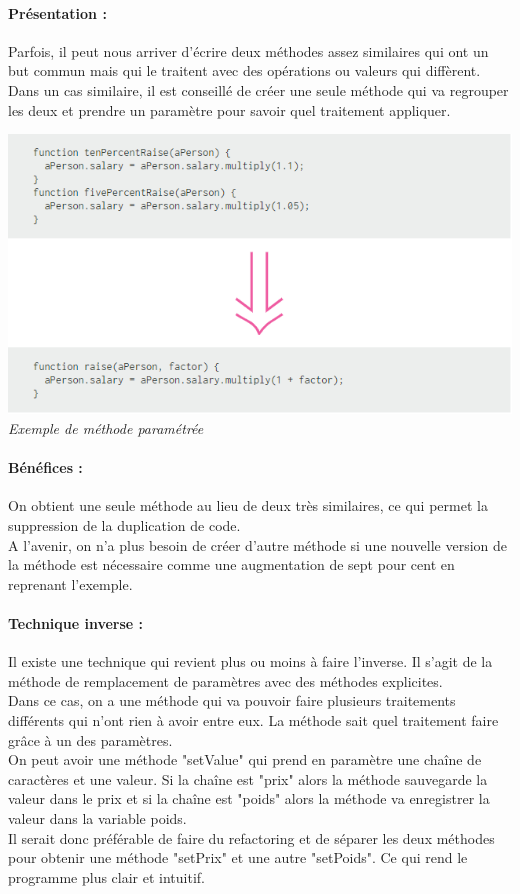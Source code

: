 \documentclass[a4paper,twoside,12pt,openright]{report}
\begin{document}
\paragraph{Présentation :}
Parfois, il peut nous arriver d'écrire deux méthodes assez similaires qui ont un but commun mais qui le traitent avec des opérations ou valeurs qui diffèrent. Dans un cas similaire, il est conseillé de créer une seule méthode qui va regrouper les deux et prendre un paramètre pour savoir quel traitement appliquer.\\

\begin{center}
\includegraphics[scale=1]{Image/Methode_Parametre.png}\\
\itshape{Exemple de méthode paramétrée \cite{ref8}}
\end{center}

\paragraph{Bénéfices :}
On obtient une seule méthode au lieu de deux très similaires, ce qui permet la suppression de la duplication de code.\\
A l'avenir, on n'a plus besoin de créer d'autre méthode si une nouvelle version de la méthode est nécessaire comme une augmentation de sept pour cent en reprenant l'exemple.\\

\paragraph{Technique inverse :}
Il existe une technique qui revient plus ou moins à faire l'inverse. Il s'agit de la méthode de remplacement de paramètres avec des méthodes explicites.\\
Dans ce cas, on a une méthode qui va pouvoir faire plusieurs traitements différents qui n'ont rien à avoir entre eux. La méthode sait quel traitement faire grâce à un des paramètres.\\
On peut avoir une méthode "setValue" qui prend en paramètre une chaîne de caractères et une valeur. Si la chaîne est "prix" alors la méthode sauvegarde la valeur dans le prix et si la chaîne est "poids" alors la méthode va enregistrer la valeur dans la variable poids.\\
Il serait donc préférable de faire du refactoring et de séparer les deux méthodes pour obtenir une méthode "setPrix" et une autre "setPoids". Ce qui rend le programme plus clair et intuitif.\\
\end{document}
